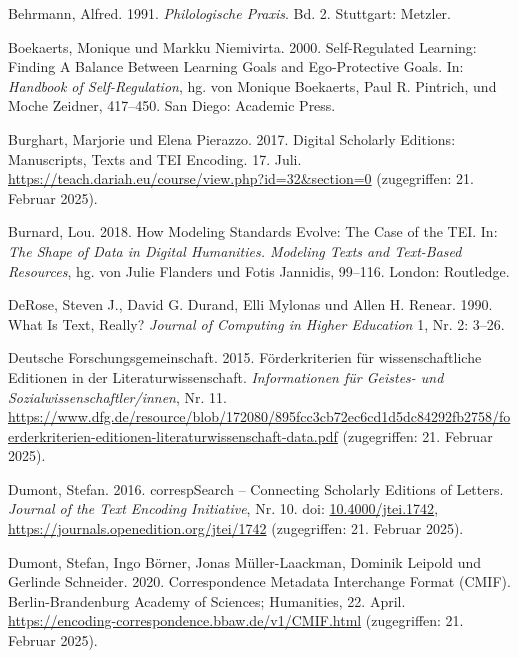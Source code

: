 \documentclass[
          a4paper,
        ]{article}
\newlength{\cslhangindent}
\newenvironment{CSLReferences}[2] %
 {\begin{list}{}{%
  \setlength{\itemindent}{0pt}
  \setlength{\leftmargin}{0pt}
  \setlength{\parsep}{0pt}
  \ifodd #1
   \setlength{\leftmargin}{\cslhangindent}
   \setlength{\itemindent}{-1\cslhangindent}
  \fi
  \setlength{\itemsep}{#2\baselineskip}}}
 {\end{list}}
\begin{document}
\label{refs}
\begin{CSLReferences}{1}{0}
Behrmann, Alfred. 1991. \emph{Philologische Praxis}. Bd. 2. Stuttgart:
Metzler.

Boekaerts, Monique und Markku Niemivirta. 2000. Self-Regulated Learning:
Finding A Balance Between Learning Goals and Ego-Protective Goals. In:
\emph{Handbook of Self-Regulation}, hg. von Monique Boekaerts, Paul R.
Pintrich, und Moche Zeidner, 417--450. San Diego: Academic Press.

Burghart, Marjorie und Elena Pierazzo. 2017. Digital Scholarly Editions:
Manuscripts, Texts and TEI Encoding. 17. Juli.
\url{https://teach.dariah.eu/course/view.php?id=32&section=0}
(zugegriffen: 21. Februar 2025).

Burnard, Lou. 2018. How Modeling Standards Evolve: The Case of the TEI.
In: \emph{The Shape of Data in Digital Humanities. Modeling Texts and
Text-Based Resources}, hg. von Julie Flanders und Fotis Jannidis,
99--116. London: Routledge.

DeRose, Steven J., David G. Durand, Elli Mylonas und Allen H. Renear.
1990. What Is Text, Really? \emph{Journal of Computing in Higher
Education} 1, Nr. 2: 3--26.

Deutsche Forschungsgemeinschaft. 2015. Förderkriterien für
wissenschaftliche Editionen in der Literaturwissenschaft.
\emph{Informationen für Geistes- und Sozialwissenschaftler/innen}, Nr.
11.
\url{https://www.dfg.de/resource/blob/172080/895fcc3cb72ec6cd1d5dc84292fb2758/foerderkriterien-editionen-literaturwissenschaft-data.pdf}
(zugegriffen: 21. Februar 2025).

Dumont, Stefan. 2016. {correspSearch} -- {Connecting} {Scholarly}
{Editions} of {Letters}. \emph{Journal of the Text Encoding Initiative},
Nr. 10. doi:
\href{https://doi.org/10.4000/jtei.1742}{10.4000/jtei.1742},
\url{https://journals.openedition.org/jtei/1742} (zugegriffen: 21.
Februar 2025).

Dumont, Stefan, Ingo Börner, Jonas Müller-Laackman, Dominik Leipold und
Gerlinde Schneider. 2020. Correspondence Metadata Interchange Format
(CMIF). Berlin-Brandenburg Academy of Sciences; Humanities, 22. April.
\url{https://encoding-correspondence.bbaw.de/v1/CMIF.html} (zugegriffen:
21. Februar 2025).


\end{CSLReferences}
\end{document}
